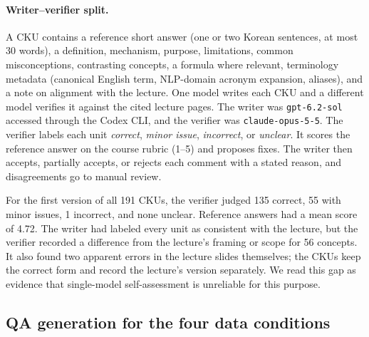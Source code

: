 \paragraph{Writer--verifier split.}
A CKU contains a reference short answer (one or two Korean sentences, at most 30 words), a definition, mechanism, purpose, limitations, common misconceptions, contrasting concepts, a formula where relevant, terminology metadata (canonical English term, NLP-domain acronym expansion, aliases), and a note on alignment with the lecture.
One model writes each CKU and a different model verifies it against the cited lecture pages.
The writer was \texttt{gpt-6.2-sol} accessed through the Codex CLI, and the verifier was \texttt{claude-opus-5-5}.
The verifier labels each unit \emph{correct}, \emph{minor issue}, \emph{incorrect}, or \emph{unclear}.
It scores the reference answer on the course rubric (1--5) and proposes fixes.
The writer then accepts, partially accepts, or rejects each comment with a stated reason, and disagreements go to manual review.

For the first version of all 191 CKUs, the verifier judged 135 correct, 55 with minor issues, 1 incorrect, and none unclear.
Reference answers had a mean score of 4.72.
The writer had labeled every unit as consistent with the lecture, but the verifier recorded a difference from the lecture's framing or scope for 56 concepts.
It also found two apparent errors in the lecture slides themselves; the CKUs keep the correct form and record the lecture's version separately.
We read this gap as evidence that single-model self-assessment is unreliable for this purpose.

\subsection{QA generation for the four data conditions}
\label{sec:method-qa}



